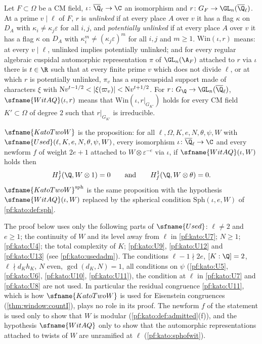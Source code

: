 \begin{definition}\label{pf:kato:def:wit}
Let $F\subset\Omega$ be a CM field, $\iota\colon\katoQlb\to\C$ an isomorphism and $r\colon G_F\to\GL_n(\katoQlb)$.
At a prime $v\mid\ell$ of $F$, $r$ is \emph{unlinked} if at every place $A$ over $v$ it has a flag $\kappa$ on
$D_A$ with $\kappa_i\ne\kappa_j\varepsilon$ for all $i,j$, and \emph{potentially unlinked} if at every place $A$
over $v$ it has a flag $\kappa$ on $D_A$ with $\kappa_i^m\ne(\kappa_j\varepsilon)^m$ for all $i,j$ and $m\ge1$.
$\mathrm{Win}(\iota,r)$ means: at every $v\mid\ell$, unlinked implies potentially unlinked; and for every
regular algebraic cuspidal automorphic representation $\pi$ of $\GL_n(\A_F)$ attached to $r$ via $\iota$ there is
$t\in\R$ such that at every finite prime $v$ which does not divide $\ell$, or at which $r$ is potentially
unlinked, $\pi_v$ has a supercuspidal support made of characters $\xi$ with
$\katoN v^{t-1/2}<|\xi(\varpi_v)|<\katoN v^{t+1/2}$. For $r\colon G_\Q\to\GL_n(\katoQlb)$,
$\sfname{WitAQ}(\iota,r)$ means that $\mathrm{Win}(\iota,r|_{G_{K'}})$ holds for every CM field $K'\subset\Omega$
of degree $2$ such that $r|_{G_{K'}}$ is irreducible.
\end{definition}

\begin{definition}\label{pf:kato:def:katotwow}
$\sfname{KatoTwoW}$ is the proposition: for all $\ell,\Omega,K,e,N,\theta,\psi,W$ with
$\sfname{Used}(\ell,K,e,N,\theta,\psi,W)$, every isomorphism $\iota\colon\katoQlb\to\C$ and every newform $f$ of
weight $2e+1$ attached to $W\otimes\varepsilon^{-e}$ via $\iota$, if $\sfname{WitAQ}(\iota,W)$ holds then
\[
  \katoHf(\Q,W\otimes1)=0\qquad\text{and}\qquad\katoHf(\Q,W\otimes\theta)=0.
\]
$\sfname{KatoTwoW}^{\mathrm{sph}}$ is the same proposition with the hypothesis $\sfname{WitAQ}(\iota,W)$ replaced by the
spherical condition $\mathrm{Sph}(\iota,e,W)$ of \cref{pf:kato:def:sph}.
\end{definition}

\begin{remark}\label{pf:kato:rem:unused}
The proof below uses only the following parts of $\sfname{Used}$: $\ell\ne2$ and $e\ge1$; the continuity of $W$
and its level away from $\ell$ in \ref{pf:kato:U7}; $N\ge1$; \ref{pf:kato:U4}; the total complexity of $K$;
\ref{pf:kato:U9}, \ref{pf:kato:U12} and \ref{pf:kato:U13} (see \cref{pf:kato:usedadm}). The conditions
$\ell-1\nmid2e$, $[K:\Q]=2$, $\ell\nmid d_Kh_K$, $N$ even, $\gcd(d_K,N)=1$, all conditions on $\psi$
(\ref{pf:kato:U5}, \ref{pf:kato:U6}, \ref{pf:kato:U10}, \ref{pf:kato:U11}), the condition at $\ell$ in
\ref{pf:kato:U7} and \ref{pf:kato:U8} are not used. In particular the residual congruence \ref{pf:kato:U11}, which is
how $\sfname{KatoTwoW}$ is used for Eisenstein congruences (\cref{thm:window:countI}), plays no role in its proof.
The newform $f$ of the statement is used only to show that $W$ is modular (\cref{pf:kato:def:admitted}(f)), and
the hypothesis $\sfname{WitAQ}$ only to show that the automorphic representations attached to twists of $W$ are
unramified at $\ell$ (\cref{pf:kato:sphofwit}).
\end{remark}

